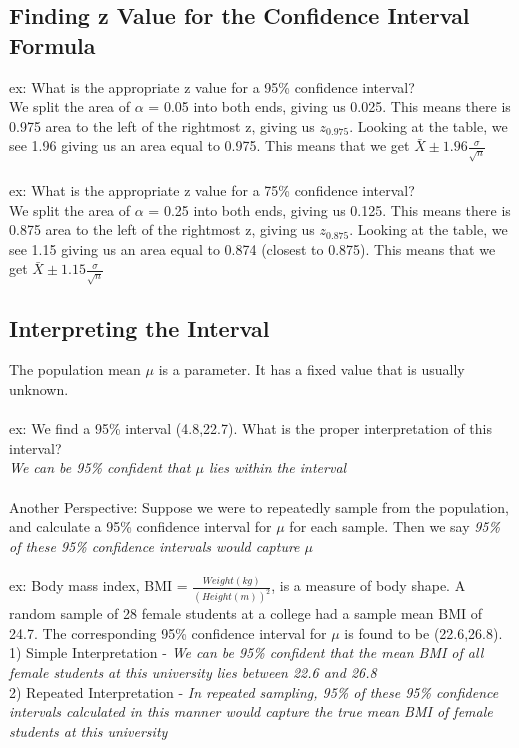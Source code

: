 \documentclass[12pt, a4paper]{article}
\begin{document}
	\subsection{Finding z Value for the Confidence Interval Formula}
	ex: What is the appropriate z value for a 95\% confidence interval? \\
	We split the area of $\alpha$ = 0.05 into both ends, giving us 0.025. This means there is 0.975 area to the left of the rightmost z, giving us $z_{0.975}$. Looking at the table, we see 1.96 giving us an area equal to 0.975. This means that we get $\bar{X} \pm 1.96 \frac{\sigma}{\sqrt{n}}$ \\~\\
	ex: What is the appropriate z value for a 75\% confidence interval? \\
	We split the area of $\alpha$ = 0.25 into both ends, giving us 0.125. This means there is 0.875 area to the left of the rightmost z, giving us $z_{0.875}$. Looking at the table, we see 1.15 giving us an area equal to 0.874 (closest to 0.875). This means that we get $\bar{X} \pm 1.15 \frac{\sigma}{\sqrt{n}}$ \newpage
	
	\subsection{Interpreting the Interval}
	The population mean $\mu$ is a parameter. It has a fixed value that is usually unknown. \\~\\
	ex: We find a 95\% interval (4.8,22.7). What is the proper interpretation of this interval? \\
	\textit{We can be 95\% confident that $\mu$ lies within the interval} \\~\\
	Another Perspective: Suppose we were to repeatedly sample from the population, and calculate a 95\% confidence interval for $\mu$ for each sample. Then we say \textit{95\% of these 95\% confidence intervals would capture $\mu$} \\~\\
	ex: Body mass index, BMI = $\frac{Weight(kg)}{(Height(m))^2}$, is a measure of body shape. A random sample of 28 female students at a college had a sample mean BMI of 24.7. The corresponding 95\% confidence interval for $\mu$ is found to be (22.6,26.8). \\
	1) Simple Interpretation - \textit{We can be 95\% confident that the mean BMI of all female students at this university lies between 22.6 and 26.8} \\
	2) Repeated Interpretation - \textit{In repeated sampling, 95\% of these 95\% confidence intervals calculated in this manner would capture the true mean BMI of female students at this university} \\~\\
	
\end{document}
